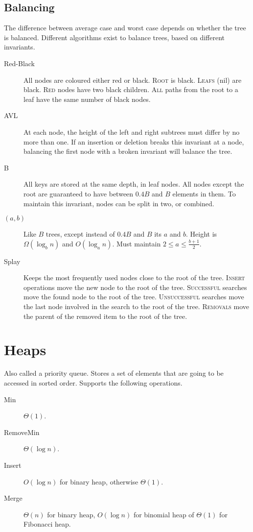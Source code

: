 \documentclass[landscape]{cheat}
\begin{document}
\begin{multicols}{3}
\subsection{Balancing}
The difference between average case and worst case depends on whether the tree is balanced.
Different algorithms exist to balance trees, based on different invariants.

\begin{description}
    \item[Red-Black]
        All nodes are coloured either red or black.
        \textsc{Root} is black.
        \textsc{Leafs} (nil) are black.
        \textsc{Red} nodes have two black children.
        \textsc{All} paths from the root to a leaf have the same number of black nodes.
    \item[AVL]
        At each node, the height of the left and right subtrees must differ by no more than one.
        If an insertion or deletion breaks this invariant at a node, balancing the first node with a broken invariant will balance the tree.
    \item[B]
        All keys are stored at the same depth, in leaf nodes.
        All nodes except the root are guaranteed to have between $0.4B$ and $B$ elements in them.
        To maintain this invariant, nodes can be split in two, or combined.
    \item[$(a,b)$]
        Like $B$ trees, except instead of $0.4B$ and $B$ its $a$ and $b$.
        Height is $\Omega(\log_b n)$ and $O(\log_a n)$.
        Must maintain $2 \leq a \leq \frac {b+1} 2$.
    \item[Splay]
        Keeps the most frequently used nodes close to the root of the tree.
        \textsc{Insert} operations move the new node to the root of the tree.
        \textsc{Successful} searches move the found node to the root of the tree.
        \textsc{Unsuccessful} searches move the last node involved in the search to the root of the tree.
        \textsc{Removals} move the parent of the removed item to the root of the tree.
\end{description}

\section{Heaps}
Also called a priority queue.
Stores a set of elements that are going to be accessed in sorted order.
Supports the following operations.

\begin{description}
    \item[Min] $\Theta(1)$.
    \item[RemoveMin] $\Theta(\log n)$.
    \item[Insert] $O(\log n)$ for binary heap, otherwise $\Theta(1)$.
    \item[Merge] $\Theta(n)$ for binary heap, $O(\log n)$ for binomial heap of $\Theta(1)$ for Fibonacci heap.
\end{description}


\end{multicols}
\end{document}
